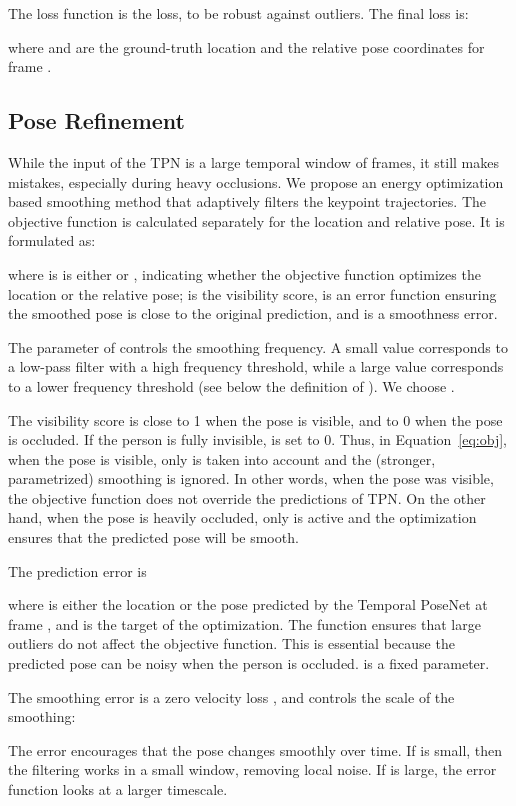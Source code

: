 \documentclass[runningheads, envcountsame, a4paper]{llncs}
\begin{document}
The loss function is the  loss, to be robust against outliers. The final loss is:

where  and  are the ground-truth location and the relative pose coordinates for frame .

\subsection{Pose Refinement} \label{sec:refiner}
While the input of the TPN is a large temporal window of frames, it still makes mistakes, especially during heavy occlusions. We propose an energy optimization based smoothing method that adaptively filters the keypoint trajectories. The objective function is calculated separately for the location and relative pose. It is formulated as:

where  is is either  or , indicating whether the objective function optimizes the location or the relative pose;  is the visibility score,  is an error function ensuring the smoothed pose is close to the original prediction, and  is a smoothness error. 

The parameter  of  controls the smoothing frequency. A small value corresponds to a low-pass filter with a high frequency threshold, while a large value corresponds to a lower frequency threshold (see below the definition of ). We choose .


The visibility score  is close to 1 when the pose is visible, and to 0 when the pose is occluded. If the person is fully invisible,  is set to 0. Thus, in Equation~\eqref{eq:obj}, when the pose is visible, only  is taken into account and the (stronger,  parametrized) smoothing is ignored. In other words, when the pose was visible, the objective function does not override the predictions of TPN. On the other hand, when the pose is heavily occluded, only  is active and the optimization ensures that the predicted pose will be smooth.

The prediction error is

where  is either the location or the pose predicted by the Temporal PoseNet at frame , and  is the target of the optimization. The  function ensures that large outliers do not affect the objective function. This is essential because the predicted pose  can be noisy when the person is occluded.  is a fixed parameter.

The smoothing error is a zero velocity loss \cite{arnab2019meshbundle}, and  controls the scale of the smoothing:

The error encourages that the pose changes smoothly over time. If  is small, then the filtering works in a small window, removing local noise. If  is large, the error function looks at a larger timescale.
\end{document}
